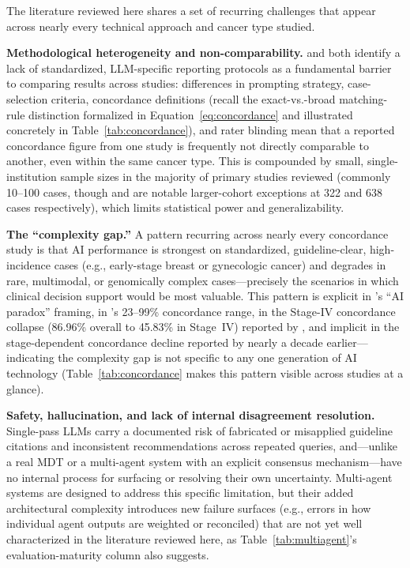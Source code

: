\documentclass[acmsmall,screen=true,review=false,nonacm=true]{acmart}
\begin{document}
The literature reviewed here shares a set of recurring challenges that appear across nearly every technical approach and cancer type studied.

\textbf{Methodological heterogeneity and non-comparability.} \citet{carl2024} and \citet{wu2026} both identify a lack of standardized, LLM-specific reporting protocols as a fundamental barrier to comparing results across studies: differences in prompting strategy, case-selection criteria, concordance definitions (recall the exact-vs.-broad matching-rule distinction formalized in Equation~\eqref{eq:concordance} and illustrated concretely in Table~\ref{tab:concordance}), and rater blinding mean that a reported concordance figure from one study is frequently not directly comparable to another, even within the same cancer type. This is compounded by small, single-institution sample sizes in the majority of primary studies reviewed (commonly 10--100 cases, though \citet{park2023} and \citet{somashekhar2018} are notable larger-cohort exceptions at 322 and 638 cases respectively), which limits statistical power and generalizability.

\textbf{The ``complexity gap.''} A pattern recurring across nearly every concordance study is that AI performance is strongest on standardized, guideline-clear, high-incidence cases (e.g., early-stage breast or gynecologic cancer) and degrades in rare, multimodal, or genomically complex cases---precisely the scenarios in which clinical decision support would be most valuable. This pattern is explicit in \citeauthor{seshachalam2026}'s \citeyearpar{seshachalam2026} ``AI paradox'' framing, in \citeauthor{wu2026}'s \citeyearpar{wu2026} 23--99\% concordance range, in the Stage-IV concordance collapse (86.96\% overall to 45.83\% in Stage~IV) reported by \citet{park2023}, and implicit in the stage-dependent concordance decline reported by \citet{somashekhar2018} nearly a decade earlier---indicating the complexity gap is not specific to any one generation of AI technology (Table~\ref{tab:concordance} makes this pattern visible across studies at a glance).

\textbf{Safety, hallucination, and lack of internal disagreement resolution.} Single-pass LLMs carry a documented risk of fabricated or misapplied guideline citations and inconsistent recommendations across repeated queries, and---unlike a real MDT or a multi-agent system with an explicit consensus mechanism---have no internal process for surfacing or resolving their own uncertainty. Multi-agent systems are designed to address this specific limitation, but their added architectural complexity introduces new failure surfaces (e.g., errors in how individual agent outputs are weighted or reconciled) that are not yet well characterized in the literature reviewed here, as Table~\ref{tab:multiagent}'s evaluation-maturity column also suggests.
\end{document}
